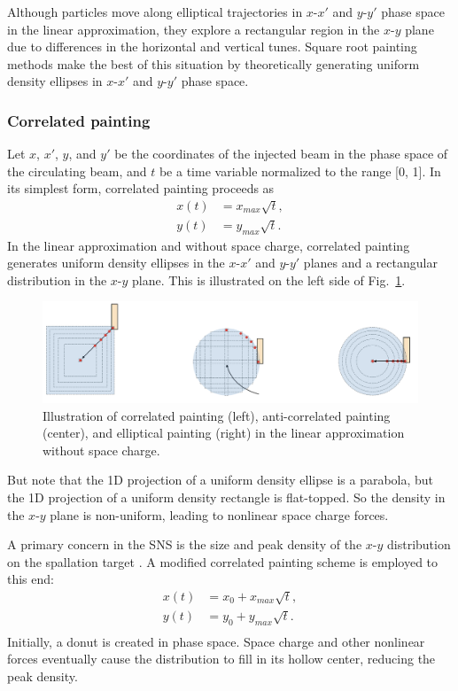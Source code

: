 Although particles move along elliptical trajectories in $x$-$x'$ and $y$-$y'$ phase space in the linear approximation, they explore a rectangular region in the $x$-$y$ plane due to differences in the horizontal and vertical tunes. Square root painting methods make the best of this situation by theoretically generating uniform density ellipses in $x$-$x'$ and $y$-$y'$ phase space. 

\subsubsection{Correlated painting}

Let $x$, $x'$, $y$, and $y'$ be the coordinates of the injected beam in the phase space of the circulating beam, and $t$ be a time variable normalized to the range [0, 1]. In its simplest form, correlated painting proceeds as
%
\begin{equation}
\begin{aligned}
    {x}(t) &= {x}_{max}\sqrt{t}, \\
    {y}(t) &= {y}_{max}\sqrt{t}.
\end{aligned}
\end{equation}
%
In the linear approximation and without space charge, correlated painting generates uniform density ellipses in the $x$-$x'$ and $y$-$y'$ planes and a rectangular distribution in the $x$-$y$ plane. This is illustrated on the left side of Fig.~\ref{fig:painting_graphic}.
%
\begin{figure}[!p]
    \centering
    \includegraphics[width=\textwidth]{Images/chapter1/painting_graphic.png}
    \caption{Illustration of correlated painting (left), anti-correlated painting (center), and elliptical painting (right) in the linear approximation without space charge.}
    \label{fig:painting_graphic}
\end{figure}
%
But note that the 1D projection of a uniform density ellipse is a parabola, but the 1D projection of a uniform density rectangle is flat-topped. So the density in the $x$-$y$ plane is non-uniform, leading to nonlinear space charge forces.

A primary concern in the SNS is the size and peak density of the $x$-$y$ distribution on the spallation target \cite{Riemer2010}. A modified correlated painting scheme is employed to this end:
%
\begin{equation}
\begin{aligned}
    {x}(t) &= x_0 + x_{max}\sqrt{t}, \\
    {y}(t) &= y_0 + y_{max}\sqrt{t}. \\
\end{aligned}
\end{equation}
%
Initially, a donut is created in phase space. Space charge and other nonlinear forces eventually cause the distribution to fill in its hollow center, reducing the peak density.


